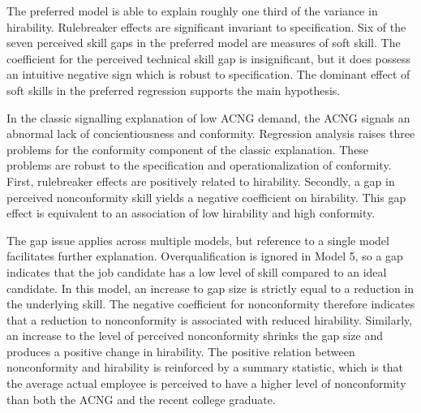 \documentclass[review]{elsarticle}
\begin{document}
The preferred model is able to explain roughly one third of the variance in hirability.
Rulebreaker effects are significant invariant to specification.
Six of the seven perceived skill gaps in the preferred model are measures of soft skill.
The coefficient for the perceived technical skill gap is insignificant, but it does possess an intuitive negative sign which is robust to specification.
The dominant effect of soft skills in the preferred regression supports the main hypothesis.

In the classic signalling explanation of low ACNG demand, the ACNG signals an abnormal lack of concientiousness and conformity.
Regression analysis raises three problems for the conformity component of the classic explanation.
These problems are robust to the specification and operationalization of conformity.
First, rulebreaker effects are positively related to hirability.
Secondly, a gap in perceived nonconformity skill yields a negative coefficient on hirability.
This gap effect is equivalent to an association of low hirability and high conformity.

The gap issue applies across multiple models, but reference to a single model facilitates further explanation.
Overqualification is ignored in Model 5, so a gap indicates that the job candidate has a low level of skill compared to an ideal candidate.
In this model, an increase to gap size is strictly equal to a reduction in the underlying skill.
The negative coefficient for nonconformity therefore indicates that a reduction to nonconformity is associated with reduced hirability.
Similarly, an increase to the level of perceived nonconformity shrinks the gap size and produces a positive change in hirability.
The positive relation between nonconformity and hirability is reinforced by a summary statistic,
which is that the average actual employee is perceived to have a higher level of nonconformity than both the ACNG and the recent college graduate.
\end{document}
